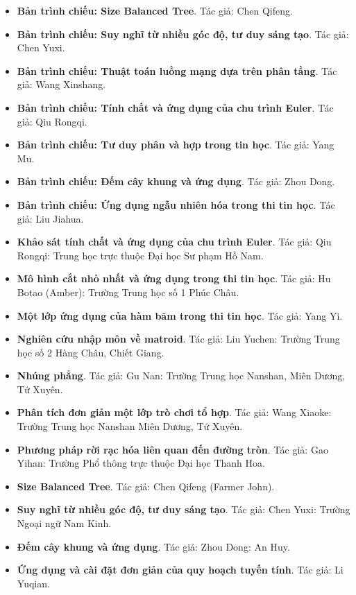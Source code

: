 \documentclass[11pt]{article}
\begin{document}
\begin{itemize}[leftmargin=2em]
  \item \textbf{Bản trình chiếu: Size Balanced Tree}. Tác giả: Chen Qifeng.
  \item \textbf{Bản trình chiếu: Suy nghĩ từ nhiều góc độ, tư duy sáng tạo}. Tác giả: Chen Yuxi.
  \item \textbf{Bản trình chiếu: Thuật toán luồng mạng dựa trên phân tầng}. Tác giả: Wang Xinshang.
  \item \textbf{Bản trình chiếu: Tính chất và ứng dụng của chu trình Euler}. Tác giả: Qiu Rongqi.
  \item \textbf{Bản trình chiếu: Tư duy phân và hợp trong tin học}. Tác giả: Yang Mu.
  \item \textbf{Bản trình chiếu: Đếm cây khung và ứng dụng}. Tác giả: Zhou Dong.
  \item \textbf{Bản trình chiếu: Ứng dụng ngẫu nhiên hóa trong thi tin học}. Tác giả: Liu Jiahua.
  \item \textbf{Khảo sát tính chất và ứng dụng của chu trình Euler}. Tác giả: Qiu Rongqi: Trung học trực thuộc Đại học Sư phạm Hồ Nam.
  \item \textbf{Mô hình cắt nhỏ nhất và ứng dụng trong thi tin học}. Tác giả: Hu Botao (Amber): Trường Trung học số 1 Phúc Châu.
  \item \textbf{Một lớp ứng dụng của hàm băm trong thi tin học}. Tác giả: Yang Yi.
  \item \textbf{Nghiên cứu nhập môn về matroid}. Tác giả: Liu Yuchen: Trường Trung học số 2 Hàng Châu, Chiết Giang.
  \item \textbf{Nhúng phẳng}. Tác giả: Gu Nan: Trường Trung học Nanshan, Miên Dương, Tứ Xuyên.
  \item \textbf{Phân tích đơn giản một lớp trò chơi tổ hợp}. Tác giả: Wang Xiaoke: Trường Trung học Nanshan Miên Dương, Tứ Xuyên.
  \item \textbf{Phương pháp rời rạc hóa liên quan đến đường tròn}. Tác giả: Gao Yihan: Trường Phổ thông trực thuộc Đại học Thanh Hoa.
  \item \textbf{Size Balanced Tree}. Tác giả: Chen Qifeng (Farmer John).
  \item \textbf{Suy nghĩ từ nhiều góc độ, tư duy sáng tạo}. Tác giả: Chen Yuxi: Trường Ngoại ngữ Nam Kinh.
  \item \textbf{Đếm cây khung và ứng dụng}. Tác giả: Zhou Dong: An Huy.
  \item \textbf{Ứng dụng và cài đặt đơn giản của quy hoạch tuyến tính}. Tác giả: Li Yuqian.
\end{itemize}
\end{document}
